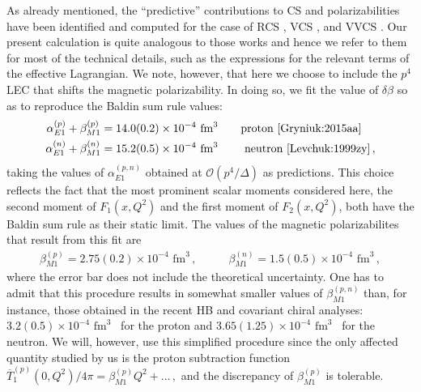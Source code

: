 \documentclass[12pt,preprint,tightenlines,
showpacs,preprintnumbers,amsmath,amssymb,
a4paper,nofootinbib]{revtex4-1}
\def\ol#1{\overline{#1}}
\begin{document}
As already mentioned, the ``predictive'' contributions to CS and polarizabilities have been identified  and computed  for the case
of RCS \cite{Lensky:2009uv}, 
VCS \cite{Lensky:2016nui}, and  VVCS \cite{Lensky:2014dda}.
Our present calculation is quite analogous to those works and hence 
we refer to them for most of the technical details, such as the expressions for the
relevant terms of the effective Lagrangian. We note, however,
that here we choose to include the $p^4$ LEC that shifts the magnetic polarizability. In doing so,
we fit the value of $\delta\beta$ so as to reproduce the Baldin sum rule values:
\begin{align}
\alpha_{E1}^{(p)}+\beta_{M1}^{(p)} & = 14.0(0.2)\times 10^{-4} \text{ fm}^3 \text{\qquad proton~\cite{Gryniuk:2015aa}}\\
\alpha_{E1}^{(n)}+\beta_{M1}^{(n)} & = 15.2(0.5)\times 10^{-4} \text{ fm}^3 \text{ \qquad neutron~\cite{Levchuk:1999zy}}\,,
\end{align}
taking the values of $\alpha_{E1}^{(p,n)}$ obtained at $\mathcal{O}(p^4/\varDelta)$ as predictions.
This choice reflects the fact that the most prominent scalar moments considered here, the second moment
of $F_1(x,Q^2)$ and the first moment of $F_2(x,Q^2)$, both have the Baldin sum rule as their static limit. The values of the magnetic polarizabilites that result from this fit are
\begin{align}
    \beta_{M1}^{(p)} = 2.75(0.2)\times10^{-4}\text{ fm}^3\,, &\qquad \beta_{M1}^{(n)} = 1.5(0.5)\times10^{-4}\text{ fm}^3\,,
\end{align}
where the error bar does not include the theoretical uncertainty. One has to admit that this procedure results in somewhat smaller values of $\beta_{M1}^{(p,n)}$ than, for instance, those obtained in the recent HB and covariant chiral analyses: $3.2(0.5)\times10^{-4}\text{ fm}^3$~\cite{Lensky:2014efa,Griesshammer:2012we} for the proton and $3.65(1.25)\times10^{-4}\text{ fm}^3$~\cite{Myers14} for the neutron.
 We will, however, use this simplified procedure since the only affected quantity studied by us
is the proton subtraction function $\ol{T}_1^{(p)}(0,Q^2)/4\pi=\beta_{M1}^{(p)}Q^2+\dots\,,$ and the
discrepancy of $\beta_{M1}^{(p)}$ is tolerable.
\end{document}
